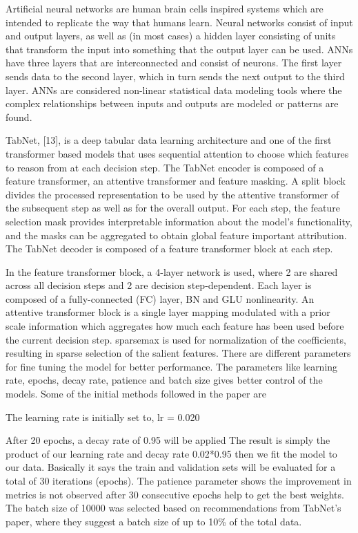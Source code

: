 \documentclass[11 pt,conference,final,]{IEEEtran}
\begin{document}
Artificial neural networks are human brain cells inspired systems which
are intended to replicate the way that humans learn. Neural networks
consist of input and output layers, as well as (in most cases) a hidden
layer consisting of units that transform the input into something that
the output layer can be used. ANNs have three layers that are
interconnected and consist of neurons. The first layer sends data to the
second layer, which in turn sends the next output to the third layer.
ANNs are considered non-linear statistical data modeling tools where the
complex relationships between inputs and outputs are modeled or patterns
are found.

TabNet, {[}13{]}, is a deep tabular data learning architecture and one
of the first transformer based models that uses sequential attention to
choose which features to reason from at each decision step. The TabNet
encoder is composed of a feature transformer, an attentive transformer
and feature masking. A split block divides the processed representation
to be used by the attentive transformer of the subsequent step as well
as for the overall output. For each step, the feature selection mask
provides interpretable information about the model's functionality, and
the masks can be aggregated to obtain global feature important
attribution. The TabNet decoder is composed of a feature transformer
block at each step.

In the feature transformer block, a 4-layer network is used, where 2 are
shared across all decision steps and 2 are decision step-dependent. Each
layer is composed of a fully-connected (FC) layer, BN and GLU
nonlinearity. An attentive transformer block is a single layer mapping
modulated with a prior scale information which aggregates how much each
feature has been used before the current decision step. sparsemax is
used for normalization of the coefficients, resulting in sparse
selection of the salient features. There are different parameters for
fine tuning the model for better performance. The parameters like
learning rate, epochs, decay rate, patience and batch size gives better
control of the models. Some of the initial methods followed in the paper
are

The learning rate is initially set to, lr = 0.020

After 20 epochs, a decay rate of 0.95 will be applied The result is
simply the product of our learning rate and decay rate 0.02*0.95 then we
fit the model to our data. Basically it says the train and validation
sets will be evaluated for a total of 30 iterations (epochs). The
patience parameter shows the improvement in metrics is not observed
after 30 consecutive epochs help to get the best weights. The batch size
of 10000 was selected based on recommendations from TabNet's paper,
where they suggest a batch size of up to 10\% of the total data.
\end{document}
